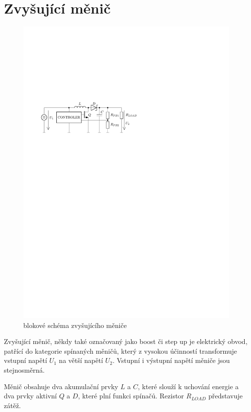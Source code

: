 \section{Zvyšující měnič}
\begin{figure}[H]
    \begin{center}
        \includegraphics[width=\textwidth]{img/boost}
    \end{center}
    \caption{blokové schéma zvyšujícího měniče}
\end{figure}
Zvyšující měnič, někdy také označovaný jako boost či step up je elektrický obvod, patřící do kategorie spínaných měničů, který z vysokou účinností transformuje vstupní napětí $U_1$ na větší napětí $U_2$. Vstupní i výstupní napětí měniče jsou stejnosměrná.

Měnič obsahuje dva akumulační prvky $L$ a $C$, které slouží k uchování energie a dva prvky aktivní $Q$ a $D$, které plní funkci spínačů. Rezistor $R_{LOAD}$ představuje zátěž.

